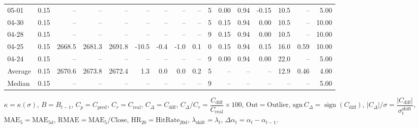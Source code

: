\begin{threeparttable}
{\begin{tabular}{lrrrrrrrrrrrrrrr}
  05-01 &     0.15 &     -- &     -- &     -- &         -- &             -- &                       -- &                  -- &              5 &       0.00 &      0.94 &          -0.15 &             10.5 &              -- &                   5.00 \\
  04-30 &     0.15 &     -- &     -- &     -- &         -- &             -- &                       -- &                  -- &              5 &       0.15 &      0.94 &           0.00 &             10.5 &              -- &                  10.00 \\
  04-28 &     0.15 &     -- &     -- &     -- &         -- &             -- &                       -- &                  -- &              9 &       0.15 &      0.94 &           0.00 &             10.5 &              -- &                  10.00 \\
  04-25 &     0.15 & 2668.5 & 2681.3 & 2691.8 &      -10.5 &           -0.4 &                     -1.0 &                 0.1 &              0 &       0.15 &      0.94 &           0.15 &             16.0 &            0.59 &                  10.00 \\
  04-24 &     0.15 &     -- &     -- &     -- &         -- &             -- &                       -- &                  -- &              9 &       0.00 &      0.94 &           0.00 &             22.0 &              -- &                   5.00 \\
Average &     0.15 & 2670.6 & 2673.8 & 2672.4 &        1.3 &            0.0 &                      0.0 &                 0.2 &              5 &         -- &        -- &             -- &             12.9 &            0.46 &                   4.00 \\
 Median &     0.15 &     -- &     -- &     -- &         -- &             -- &                       -- &                  -- &              9 &         -- &        -- &             -- &               -- &              -- &                   5.00 \\
\bottomrule
\end{tabular}
}
\begin{tablenotes}\footnotesize
\item $\kappa=\kappa(\sigma)$, $B=B_{t-1}$, $C_p=C_{\text{pred}}$, $C_r=C_{\text{real}}$, $C_\Delta=C_{\text{diff}}$, $C_\Delta/C_r=\dfrac{C_{\text{diff}}}{C_{\text{real}}}\times100$, $\mathrm{Out}=\text{Outlier}$, $\mathrm{sgn}\,C_\Delta=\operatorname{sign}(C_{\text{diff}})$, $|C_\Delta|/\sigma=\dfrac{|C_{\text{diff}}|}{\sigma_t^{\text{shift}}}$, $\mathrm{MAE}_5=\mathrm{MAE}_{5\text{d}}$, $\mathrm{RMAE}= \mathrm{MAE}_5 / \text{Close}$, $\mathrm{HR}_{20}=\mathrm{HitRate}_{20\text{d}}$, 
$\lambda_{\text{shift}}=\lambda_t$, 
$\Delta\alpha_t=\alpha_t-\alpha_{t-1}$.
\end{tablenotes}
\end{threeparttable}
\endgroup

